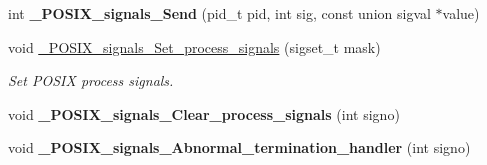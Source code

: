 \begin{DoxyCompactItemize}
\mbox{\label{group__POSIX__SIGNALS_ga4fa52d65c93199947ea927f8eb978f59}} 
int {\bfseries \+\_\+\+P\+O\+S\+I\+X\+\_\+signals\+\_\+\+Send} (pid\+\_\+t pid, int sig, const union sigval $\ast$value)
\item 
\mbox{\label{group__POSIX__SIGNALS_gab678ac01e81226400e1326d3fbb92e77}} 
void \mbox{\hyperlink{group__POSIX__SIGNALS_gab678ac01e81226400e1326d3fbb92e77}{\+\_\+\+P\+O\+S\+I\+X\+\_\+signals\+\_\+\+Set\+\_\+process\+\_\+signals}} (sigset\+\_\+t mask)
\begin{DoxyCompactList}\small\item\em Set P\+O\+S\+IX process signals. \end{DoxyCompactList}\item 
\mbox{\label{group__POSIX__SIGNALS_ga377c1cea1bf61b4676ae03b1bc67b2bf}} 
void {\bfseries \+\_\+\+P\+O\+S\+I\+X\+\_\+signals\+\_\+\+Clear\+\_\+process\+\_\+signals} (int signo)
\item 
\mbox{\label{group__POSIX__SIGNALS_ga033020fcb7d939b549c0d269aa077a6f}} 
void {\bfseries \+\_\+\+P\+O\+S\+I\+X\+\_\+signals\+\_\+\+Abnormal\+\_\+termination\+\_\+handler} (int signo)
\end{DoxyCompactItemize}
